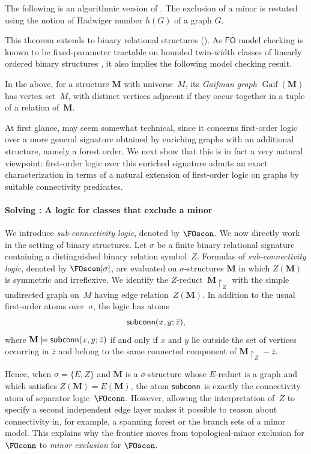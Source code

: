 \documentclass[1p,number,11pt]{elsarticle}
\newcommand{\scon}{\hbox{\sf subconn}}
\newcommand{\Gaif}{\operatorname{Gaif}}
\theoremstyle{plain}
\newcommand{\MZ}{\mathbf M\!\upharpoonright_Z}
\renewcommand{\FO}{\ensuremath{\mathsf{FO}}}
\begin{document}
The following is an algorithmic version of  . The exclusion of a minor is restated using the notion of Hadwiger number $h(G)$ of a graph $G$.


This theorem extends to binary relational structures (). 
As $\FO$ model checking is known to be fixed-parameter tractable on bounded twin-width classes of linearly ordered binary structures \cite{bonnet2024twin},
it also implies the following model checking result.



In the above, for a structure $\mathbf M$ with universe~$M$, its
\emph{Gaifman graph} $\Gaif(\mathbf M)$ has vertex set~$M$, with
distinct vertices adjacent if they occur together in a tuple of
a relation of~$\mathbf M$.

At first glance,  may seem somewhat technical, since it concerns first-order logic over a more general signature obtained by enriching graphs with an additional structure, namely a forest order.
We next show that this is in fact a very natural viewpoint: first-order logic over this enriched signature admits an exact characterization in terms of a natural extension of first-order logic on graphs by suitable connectivity predicates.

\paragraph{Solving : A logic for classes that exclude a minor}
We introduce \emph{sub-connectivity logic}, denoted by $\FOscon$. 
We now directly work in the setting of binary structures. Let
$\sigma$ be a finite binary relational signature containing a distinguished
binary relation symbol~$Z$. Formulas of \emph{sub-connectivity logic},
denoted by $\FOscon[\sigma]$, are evaluated on $\sigma$-structures
$\mathbf M$ in which $Z(\mathbf M)$ is symmetric and irreflexive. We identify
the $Z$-reduct~$\MZ$ with the simple undirected graph
on~$M$ having edge relation~$Z(\mathbf M)$. In addition to the usual
first-order atoms over~$\sigma$, the logic has atoms
\[
   \scon(x,y;\bar z),
\]
where $\mathbf M\models\scon(x,y;\bar z)$ if and only if $x$ and $y$ lie
outside the set of vertices occurring in $\bar z$ and belong to the same
connected component of $\mathbf M\!\upharpoonright_Z-\bar z$.

Hence, when $\sigma=\{E,Z\}$ and $\mathbf M$ is a $\sigma$-structure whose
$E$-reduct is a graph and which satisfies $Z(\mathbf M)=E(\mathbf M)$, the atom $\scon$ is exactly the connectivity atom of separator logic~$\FOconn$.
However, allowing the interpretation of~$Z$
to specify a second independent edge layer makes it possible to reason about
connectivity in, for example, a spanning forest or the branch sets of a minor
model. This explains why the frontier moves from topological-minor exclusion
for $\FOconn$ to \emph{minor exclusion} for $\FOscon$.
\end{document}
